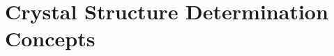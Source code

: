 % 
%





\renewcommand{\chabbr}{STRDET}

\chapterimage{\noheaderimage}

\chapter{Crystal Structure Determination Concepts}\label{\chabbr:ch:StructureDetermination} %

